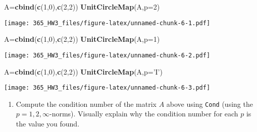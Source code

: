 \documentclass[]{article}
\newenvironment{Shaded}{\begin{snugshade}}{\end{snugshade}}
\newcommand{\DataTypeTok}[1]{\textcolor[rgb]{0.13,0.29,0.53}{#1}}
\newcommand{\DecValTok}[1]{\textcolor[rgb]{0.00,0.00,0.81}{#1}}
\newcommand{\KeywordTok}[1]{\textcolor[rgb]{0.13,0.29,0.53}{\textbf{#1}}}
\newcommand{\NormalTok}[1]{#1}
\newcommand{\StringTok}[1]{\textcolor[rgb]{0.31,0.60,0.02}{#1}}
\providecommand{\tightlist}{%
  \setlength{\itemsep}{0pt}\setlength{\parskip}{0pt}}
\begin{document}
\begin{Shaded}
\begin{Highlighting}[]
\NormalTok{A=}\KeywordTok{cbind}\NormalTok{(}\KeywordTok{c}\NormalTok{(}\DecValTok{1}\NormalTok{,}\DecValTok{0}\NormalTok{),}\KeywordTok{c}\NormalTok{(}\DecValTok{2}\NormalTok{,}\DecValTok{2}\NormalTok{))}
\KeywordTok{UnitCircleMap}\NormalTok{(A,}\DataTypeTok{p=}\DecValTok{2}\NormalTok{)}
\end{Highlighting}
\end{Shaded}

\texttt{[image: 365\_HW3\_files/figure-latex/unnamed-chunk-6-1.pdf]}

\begin{Shaded}
\begin{Highlighting}[]
\NormalTok{A=}\KeywordTok{cbind}\NormalTok{(}\KeywordTok{c}\NormalTok{(}\DecValTok{1}\NormalTok{,}\DecValTok{0}\NormalTok{),}\KeywordTok{c}\NormalTok{(}\DecValTok{2}\NormalTok{,}\DecValTok{2}\NormalTok{))}
\KeywordTok{UnitCircleMap}\NormalTok{(A,}\DataTypeTok{p=}\DecValTok{1}\NormalTok{)}
\end{Highlighting}
\end{Shaded}

\texttt{[image: 365\_HW3\_files/figure-latex/unnamed-chunk-6-2.pdf]}

\begin{Shaded}
\begin{Highlighting}[]
\NormalTok{A=}\KeywordTok{cbind}\NormalTok{(}\KeywordTok{c}\NormalTok{(}\DecValTok{1}\NormalTok{,}\DecValTok{0}\NormalTok{),}\KeywordTok{c}\NormalTok{(}\DecValTok{2}\NormalTok{,}\DecValTok{2}\NormalTok{))}
\KeywordTok{UnitCircleMap}\NormalTok{(A,}\DataTypeTok{p=}\StringTok{'I'}\NormalTok{)}
\end{Highlighting}
\end{Shaded}

\texttt{[image: 365\_HW3\_files/figure-latex/unnamed-chunk-6-3.pdf]}

\begin{enumerate}
\def\labelenumi{(\alph{enumi})}
\setcounter{enumi}{1}
\tightlist
\item
  Compute the condition number of the matrix \(A\) above using
  \texttt{Cond} (using the \(p=1,2, \infty\)-norms). Visually explain
  why the condition number for each \(p\) is the value you found.
\end{enumerate}
\end{document}
